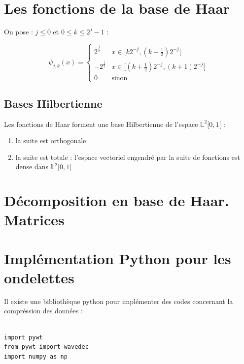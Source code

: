 \documentclass{article}
\begin{document}

\section{Les fonctions de la base de Haar}

On pose : $j \leqslant 0$ et $0 \leqslant k \leqslant 2^j-1$ : 

\[ 
{\psi_{j,k}(x)}= \left\{
\begin{array}{ll}
      2^{\frac{j}{2}} & x \in [k2^{-j}, (k+\frac{1}{2})2^{-j} [\\
      -2^{\frac{j}{2}} & x \in [(k+\frac{1}{2})2^{-j}, (k+1)2^{-j}[ \\
      0 & \text{sinon}
\end{array} 
\right. 
\]

\subsection{Bases Hilbertienne}

Les fonctions de Haar forment une base Hilbertienne de l'espace $\mathbb{L}^2[0,1[$ :

\begin{enumerate}
    \item la suite est orthogonale
    \item la suite est totale : l'espace vectoriel engendré par la suite de fonctions est dense dans $\mathbb{L}^2[0,1[$
\end{enumerate}

\section{Décomposition en base de Haar. Matrices}

\section{Implémentation Python pour les ondelettes}

Il existe une bibliothèque python pour implémenter des codes concernant la compréssion des données :

\begin{lstlisting}

import pywt
from pywt import wavedec
import numpy as np

\end{lstlisting}
\end{document}
